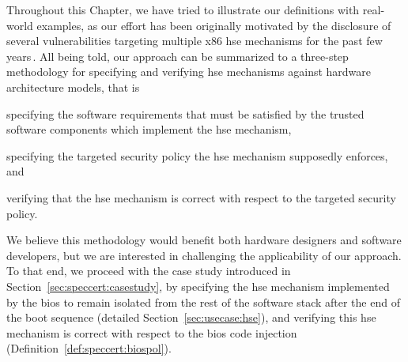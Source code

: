 Throughout this Chapter, we have tried to illustrate our definitions with
real-world examples, as our effort has been originally motivated by the
disclosure of several vulnerabilities targeting multiple x86 \ac{hse} mechanisms
for the past few
years\,\cite{wojtczuk2009smram,duflot2009smram,rutkowska2008remap,domas2015sinkhole,kallenberg2015racecondition}.
%
All being told, our approach can be summarized to a three-step methodology for
specifying and verifying \ac{hse} mechanisms against hardware architecture
models, that is
%
\begin{inparaenum}[(1)]
\item specifying the software requirements that must be satisfied by the trusted
  software components which implement the \ac{hse} mechanism,
%
\item specifying the targeted security policy the \ac{hse} mechanism supposedly
  enforces, and
%
\item verifying that the \ac{hse} mechanism is correct with respect to the
  targeted security policy.
\end{inparaenum}
%
We believe this methodology would benefit both hardware designers and software
developers, but we are interested in challenging the applicability of our
approach.
%
To that end, we proceed with the case study introduced in
Section~\ref{sec:speccert:casestudy}, by specifying the \ac{hse} mechanism
implemented by the \ac{bios} to remain isolated from the rest of the software
stack after the end of the boot sequence (detailed
Section~\ref{sec:usecase:hse}), and verifying this \ac{hse} mechanism is correct
with respect to the \ac{bios} code injection
(Definition~\ref{def:speccert:biospol}).
